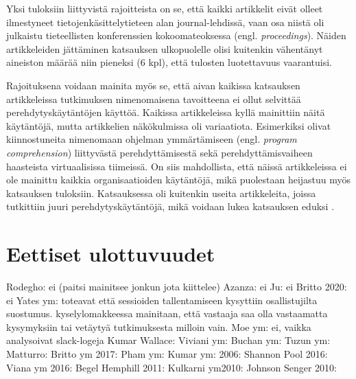 \documentclass[utf8]{gradu3}
\begin{document}
Yksi tuloksiin liittyvistä rajoitteista on se, että kaikki artikkelit eivät olleet ilmestyneet tietojenkäsittelytieteen alan journal-lehdissä, vaan osa niistä oli julkaistu tieteellisten konferenssien kokoomateoksessa (engl. \textit{proceedings}). Näiden artikkeleiden jättäminen katsauksen ulkopuolelle olisi kuitenkin vähentänyt aineiston määrää niin pieneksi (6 kpl), että tulosten luotettavuus vaarantuisi.

Rajoituksena voidaan mainita myös se, että aivan kaikissa katsauksen artikkeleissa tutkimuksen nimenomaisena tavoitteena ei ollut selvittää perehdytyskäytäntöjen käyttöä. Kaikissa artikkeleissa kyllä mainittiin näitä käytäntöjä, mutta artikkelien näkökulmissa oli variaatiota. Esimerkiksi \textcite{yates-ym-2020} olivat kiinnostuneita nimenomaan ohjelman ymmärtämiseen (engl. \textit{program comprehension}) liittyvästä perehdyttämisestä sekä \textcite{hemphill-begel-2011} perehdyttämisvaiheen haasteista virtuaalisissa tiimeissä. On siis mahdollista, että näissä artikkeleissa ei ole mainittu kaikkia organisaatioiden käytäntöjä, mikä puolestaan heijastuu myös katsauksen tuloksiin. Katsauksessa oli kuitenkin useita artikkeleita, joissa tutkittiin juuri perehdytyskäytäntöjä, mikä voidaan lukea katsauksen eduksi
%
\parencites%
    {ju-ym-2021}%
    {britto-ym-2020}%
    {moe-ym-2020}%
    {viviani-murphy-2019}%
    {buchan-ym-2019}%
    {johnson-senges-2010}%
\relax.
%

\section{Eettiset ulottuvuudet}

Rodegho: ei (paitsi mainitsee jonkun jota kiittelee)
Azanza: ei
Ju:  ei
Britto 2020: ei
Yates ym: toteavat että sessioiden tallentamiseen kysyttiin osallistujilta suostumus. kyselylomakkeessa mainitaan, että vastaaja saa olla vastaamatta kysymyksiin tai vetäytyä tutkimuksesta milloin vain.
Moe ym: ei, vaikka analysoivat slack-logeja
Kumar Wallace: 
Viviani ym: 
Buchan ym: 
Tuzun ym: 
Matturro:
Britto ym 2017: 
Pham ym: 
Kumar ym: 2006:
Shannon Pool 2016:
Viana ym 2016:
Begel Hemphill 2011:
Kulkarni ym2010:
Johnson Senger 2010: 



\end{document}
